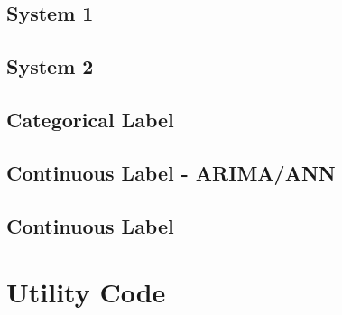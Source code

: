 \subsection{System 1}
\label{appA:ts_1}


\subsection{System 2}
\label{appA:ts_2}


\subsection{Categorical Label}
\label{appA:ts_4}


\subsection{Continuous Label - ARIMA/ANN}
\label{appA:ts_3a}


\subsection{Continuous Label}
\label{appA:ts_3}


\section{Utility Code}
\label{appA:utility}

